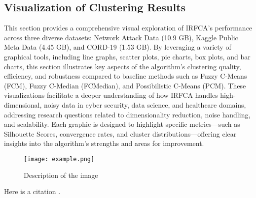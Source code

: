 \documentclass[twoside,11pt]{article}
\renewcommand{\cite}{\citep}
\begin{document}
\subsection{Visualization of Clustering Results}
This section provides a comprehensive visual exploration of IRFCA’s performance across three diverse datasets: Network Attack Data (10.9 GB), Kaggle Public Meta Data (4.45 GB), and CORD-19 (1.53 GB). By leveraging a variety of graphical tools, including line graphs, scatter plots, pie charts, box plots, and bar charts, this section illustrates key aspects of the algorithm’s clustering quality, efficiency, and robustness compared to baseline methods such as Fuzzy C-Means (FCM), Fuzzy C-Median (FCMedian), and Possibilistic C-Means (PCM). These visualizations facilitate a deeper understanding of how IRFCA handles high-dimensional, noisy data in cyber security, data science, and healthcare domains, addressing research questions related to dimensionality reduction, noise handling, and scalability. Each graphic is designed to highlight specific metrics—such as Silhouette Scores, convergence rates, and cluster distributions—offering clear insights into the algorithm’s strengths and areas for improvement. 


\begin{figure}[h] %
    \centering
    \texttt{[image: example.png]} %
    \caption{Description of the image}
    \label{fig:example}
\end{figure}


Here is a citation \cite{chow:68}.




\newpage

\appendix
\section{}
\label{app:theorem}
\end{document}
